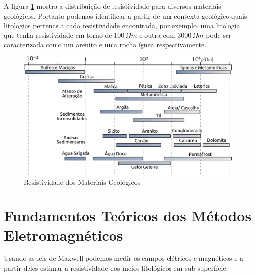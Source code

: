     A figura \ref{tabela_resistividade} mostra a distribuição de resistividade para diversos materiais geológicos. 
    Portanto podemos identificar a partir de um contexto geológico quais litologias pertence a cada resistividade encontrada, por exemplo, uma litologia que tenha resistividade em torno de  $100 \, \Omega m$ e outra com $3000 \, \Omega m $ pode ser caracterizada como um arenito e uma rocha ígnea respectivamente. 
    
    \begin{figure}[h]
        \centering
        \caption{Resistividade dos Materiais Geológicos}
        \centerline{\includegraphics[width=14cm]{texto/fig/resistividade_tabela.png}}
        \label{tabela_resistividade}
    \end{figure}
    
    
    
    \section{Fundamentos Teóricos dos Métodos Eletromagnéticos}
        Usando as leis de Maxwell \cite{eletromag8hayt} podemos medir os campos elétricos e magnéticos e a partir deles estimar a resistividade dos meios litológicos em sub-superfície.
	

